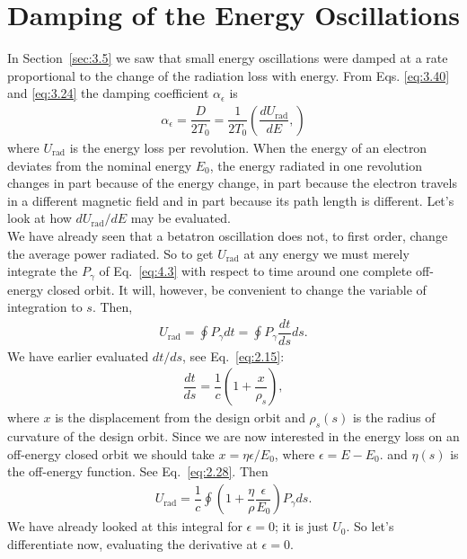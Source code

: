 \documentclass[../sands-adaptation.tex]{subfiles}
\begin{document}
\section{Damping of the Energy Oscillations}\label{sec:4.2}

In Section~\ref{sec:3.5} we saw that small energy oscillations were damped at a rate proportional
 to the change of the radiation loss with energy. From Eqs. \eqref{eq:3.40} and \eqref{eq:3.24} the damping coefficient $\alpha_\epsilon$ is
\begin{align}
	\alpha_\epsilon = \dfrac{D}{2 T_0} = \dfrac{1}{2 T_0} \left( \dfrac{d U_\text{rad}}{d E}, \right)
\end{align}
where $U_\text{rad}$ is the energy loss per revolution. When the energy of an electron deviates from the nominal energy $E_0$, the energy radiated in one revolution changes in part because of the energy change, in part because the electron travels in a different magnetic field and in part because its path length is different. Let’s look at how $dU_\text{rad}/dE$ may be evaluated.\\
We have already seen that a betatron oscillation does not, to first order, change the average power radiated. So to get $U_\text{rad}$ at any energy we must merely integrate the $P_\gamma$ of Eq.~\eqref{eq:4.3} with respect to time around one complete off-energy closed orbit. It will, however, be convenient to change the variable of integration to $s$. Then,
\begin{align}
	U_\text{rad} = \oint P_\gamma dt = \oint P_\gamma \dfrac{dt}{ds} ds.
\end{align}
We have earlier evaluated $dt/ds$, see Eq.~\eqref{eq:2.15}:
\begin{align*}
	\dfrac{dt}{ds} = \dfrac{1}{c} \left( 1 + \dfrac{x}{\rho_s} \right),
\end{align*}
where $x$ is the displacement from the design orbit and $\rho_s(s)$ is the radius of curvature of the design orbit. Since we are now interested in the energy loss on an off-energy closed orbit we should take $x = \eta \epsilon/E_0$, where $\epsilon = E - E_0$. and $\eta(s)$ is
the off-energy function. See Eq.~\eqref{eq:2.28}. Then
\begin{align}
	U_\text{rad} = \dfrac{1}{c} \oint \left( 1 + \dfrac{\eta}{\rho} \dfrac{\epsilon}{E_0} \right) P_\gamma ds.
\end{align}
We have already looked at this integral for $\epsilon = 0$; it is just $U_0$. So let’s differentiate now, evaluating the derivative at $\epsilon = 0$.
\end{document}
